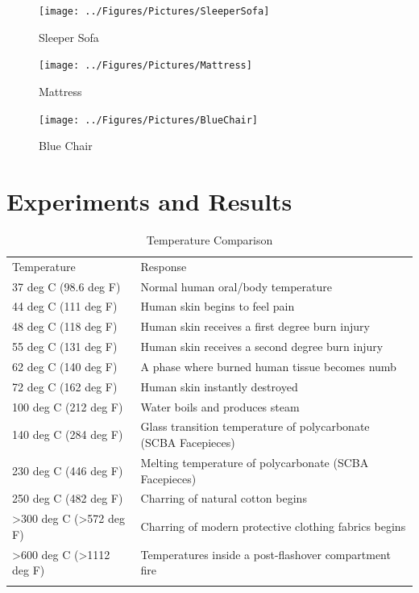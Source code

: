 \documentclass[12pt,oneside]{book}
\begin{document}
\begin{figure}[!ht]
	\texttt{[image: ../Figures/Pictures/SleeperSofa]}
	\caption{Sleeper Sofa}
	\label{fig:Sleeper_Sofa}
\end{figure}

\begin{figure}[!ht]
	\texttt{[image: ../Figures/Pictures/Mattress]}
	\caption{Mattress}
	\label{fig:Mattress}
\end{figure}

\begin{figure}[!ht]
	\texttt{[image: ../Figures/Pictures/BlueChair]}
	\caption{Blue Chair}
	\label{fig:Blue_Chair}
\end{figure}

\chapter{Experiments and Results}
\label{chap:Experiments_and_Results}

\begin{table}
	\centering
	\caption{Temperature Comparison}
	\begin{tabular}{ll}
		\hline\noalign{\smallskip}
		Temperature				 & Response		\\
		\noalign{\smallskip}\hline\noalign{\smallskip}
		37 deg C (98.6 deg F)    &  Normal human oral/body temperature      \\
		44 deg C (111 deg F)   	 & Human skin begins to feel pain     \\
		48 deg C (118 deg F) 	 & Human skin receives a first degree burn injury      \\
		55 deg C (131 deg F)     & Human skin receives a second degree burn injury    \\
		62 deg C (140 deg F)     & A phase where burned human tissue becomes numb    \\
		72 deg C (162 deg F)     & Human skin instantly destroyed     \\
		100 deg C (212 deg F)    & Water boils and produces steam    \\
		140 deg C (284 deg F)    & Glass transition temperature of polycarbonate (SCBA Facepieces)      \\
		230 deg C (446 deg F)    & Melting temperature of polycarbonate (SCBA Facepieces)    \\
		250 deg C (482 deg F)    & Charring of natural cotton begins     \\
		>300 deg C (>572 deg F)  & Charring of modern protective clothing fabrics begins    \\
		>600 deg C (>1112 deg F) & Temperatures inside a post-flashover compartment fire     \\
		\noalign{\smallskip}\hline
	\end{tabular}
	\label{tab:Temperature_Comparison}
\end{table}
\end{document}
